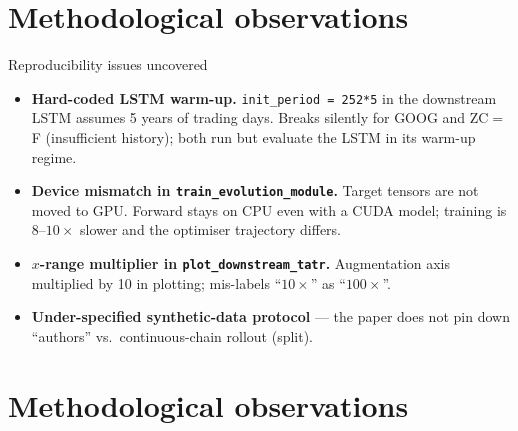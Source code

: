 \section{Methodological observations}

\begin{frame}{Reproducibility issues uncovered}
\begin{itemize}\setlength\itemsep{4pt}
  \item \textbf{Hard-coded LSTM warm-up.}
        \texttt{init\_period = 252*5} in the downstream LSTM assumes 5 years of trading days.
        Breaks silently for GOOG and ZC$=$F (insufficient history); both run but evaluate the LSTM in its warm-up regime.
  \item \textbf{Device mismatch in \texttt{train\_evolution\_module}.}
        Target tensors are not moved to GPU. Forward stays on CPU even with a CUDA model; training is $8$--$10\times$ slower and the optimiser trajectory differs.
  \item \textbf{$x$-range multiplier in \texttt{plot\_downstream\_tatr}.}
        Augmentation axis multiplied by 10 in plotting; mis-labels ``$10\times$'' as ``$100\times$''.
  \item \textbf{Under-specified synthetic-data protocol} --- the paper does not pin down ``authors'' vs.\ continuous-chain rollout (split).
\end{itemize}
\end{frame}


\section{Methodological observations}

